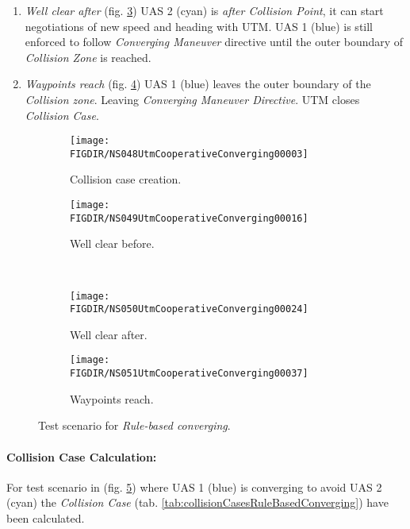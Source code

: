 \begin{enumerate}
    \item \emph{Well clear after} (fig. \ref{fig:ruleBasedConvergingWellClearAfter}) UAS 2 (cyan) is \emph{after Collision Point}, it can start negotiations of new speed and heading with UTM. UAS 1 (blue) is still enforced to follow \emph{Converging Maneuver} directive until the outer boundary of \emph{Collision Zone} is reached.
    
    \item \emph{Waypoints reach} (fig. \ref{fig:ruleBasedConvergingWaypointsReach})  UAS 1 (blue) leaves the outer boundary of the \emph{Collision zone}. Leaving \emph{Converging Maneuver Directive}. UTM closes \emph{Collision Case}.
\end{enumerate}


\begin{figure}[H]
    \centering
    \begin{subfigure}{0.48\textwidth}
    	\centering
        \texttt{[image: \\FIGDIR/NS048UtmCooperativeConverging00003]}
        \caption{Collision case creation.}
        \label{fig:ruleBasedConvergingCollisionCaseCreation}
    \end{subfigure}
    \begin{subfigure}{0.48\textwidth}
    	\centering
        \texttt{[image: \\FIGDIR/NS049UtmCooperativeConverging00016]} 
        \caption{Well clear before.}
        \label{fig:ruleBasedConvergingWellClearBefore}
    \end{subfigure}
    \\
    \begin{subfigure}{0.48\textwidth}
    	\centering
        \texttt{[image: \\FIGDIR/NS050UtmCooperativeConverging00024]} 
        \caption{Well clear after.}
        \label{fig:ruleBasedConvergingWellClearAfter}
    \end{subfigure}
    \begin{subfigure}{0.48\textwidth}
    	\centering
        \texttt{[image: \\FIGDIR/NS051UtmCooperativeConverging00037]} 
        \caption{Waypoints reach.}
        \label{fig:ruleBasedConvergingWaypointsReach}
    \end{subfigure}
    \caption{Test scenario for \emph{Rule-based converging}. }
    \label{fig:testCaseRuleBasedConverging}
\end{figure}


\paragraph{Collision Case Calculation:} For test scenario in (fig. \ref{fig:testCaseRuleBasedConverging}) where UAS 1 (blue) is converging to avoid UAS 2 (cyan) the \emph{Collision Case} (tab. \ref{tab:collisionCasesRuleBasedConverging}) have been calculated. 

